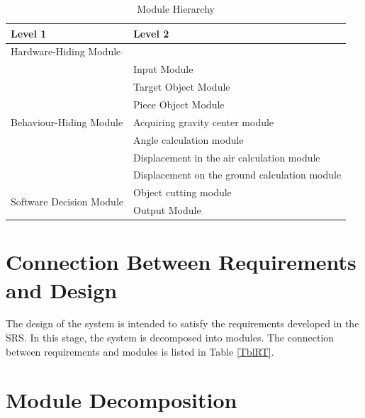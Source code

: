 \documentclass[12pt, titlepage]{article}
\begin{document}
	
	\begin{table}[h!]
		\centering
		\begin{tabular}{p{} p{}}
			\toprule
			\textbf{Level 1} & \textbf{Level 2}\\
			\midrule
			
			{Hardware-Hiding Module} & ~ \\
			\midrule
			
			\multirow{7}{0.3\textwidth}{Behaviour-Hiding Module} & Input Module\\
			& Target Object Module\\
			& Piece Object Module\\
			& Acquiring gravity center module\\
			& Angle calculation module\\
			& Displacement in the air calculation module\\
			& Displacement on the ground calculation module\\
			\midrule
			
			\multirow{3}{0.3\textwidth}{Software Decision Module} & Object cutting module\\
			& Output Module\\
			\bottomrule
			
		\end{tabular}
		\caption{Module Hierarchy}
		\label{TblMH}
	\end{table}
	

	\section{Connection Between Requirements and Design} \label{SecConnection}
	
	The design of the system is intended to satisfy the requirements developed in
	the SRS. In this stage, the system is decomposed into modules. The connection
	between requirements and modules is listed in Table \ref{TblRT}.
	
	\section{Module Decomposition} \label{SecMD}
	
\end{document}

